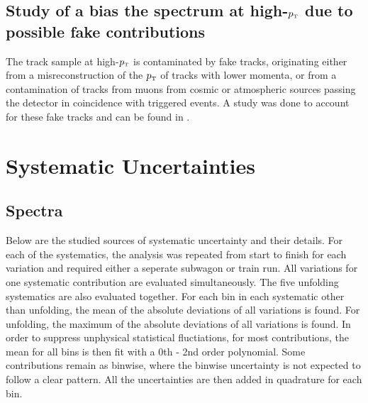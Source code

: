 \documentclass[ALICE]{ALICE_analysis_notes}
\newcommand{\pT}{$p_{\mbox{\tiny T}}$\xspace}
\begin{document}
\subsection{Study of a bias the spectrum at high-\texorpdfstring{\pT}{pT} due to possible fake contributions}
\label{sec:biasStudy}

The track sample at high-\pT is contaminated by fake tracks, originating either from a misreconstruction of the \pT of tracks with lower momenta, or from a contamination of tracks from muons from cosmic or atmospheric sources passing the detector in coincidence with triggered events. A study was done to account for these fake tracks and can be found in \cite{anaNoteMFasel}.\clearpage{}
\clearpage{}\section{Systematic Uncertainties}
\label{chap:Systematics}

\subsection{Spectra}
\label{sec:SystematicsSpectra}

Below are the studied sources of systematic uncertainty and their details. For each of the systematics, the analysis was repeated from start to finish for each variation and required either a seperate subwagon or train run. All variations for one systematic contribution are evaluated simultaneously. The five unfolding systematics are also evaluated together. For each bin in each systematic other than unfolding, the mean of the absolute deviations of all variations is found. For unfolding, the maximum of the absolute deviations of all variations is found. In order to suppress unphysical statistical fluctiations, for most contributions, the mean for all bins is then fit with a 0th - 2nd order polynomial. Some contributions remain as binwise, where the binwise uncertainty is not expected to follow a clear pattern. All the uncertainties are then added in quadrature for each bin.
\end{document}
